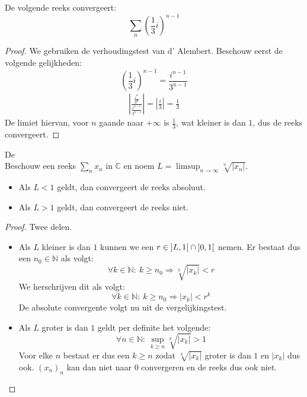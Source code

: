 \documentclass[main.tex]{subfiles}
\begin{document}
\begin{vb}
  De volgende reeks convergeert:
  \[ \sum_{n}\left(\frac{1}{3}i\right)^{n-1} \]

  \begin{proof}
    We gebruiken de verhoudingstest van d' Alembert.
    Beschouw eerst de volgende gelijkheden:
    \[ \left(\frac{1}{3}i\right)^{n-1} = \frac{i^{n-1}}{3^{n-1}} \]
    \begin{align*}
      \left| \frac{\frac{i^{n}}{3^{n}}}{\frac{i^{n-1}}{3^{n-1}}} \right|
      = \left| \frac{i}{3} \right|
      = \frac{1}{3}
    \end{align*}
    De limiet hiervan, voor $n$ gaande naar $+\infty$ is $\frac{1}{3}$, wat kleiner is dan $1$, dus de reeks convergeert.
  \end{proof}
\end{vb}

\begin{st}
  \label{st:worteltest-cauchy}
  De \\
  Beschouw een reeks $\sum_{n}x_{n}$ in $\mathbb{C}$ en noem $L= \limsup_{n\rightarrow \infty}\sqrt[n]{|x_{n}|}$.
  \begin{itemize}
  \item Als $L<1$ geldt, dan convergeert de reeks absoluut.
  \item Als $L>1$ geldt, dan convergeert de reeks niet.
  \end{itemize}

  \begin{proof}
    Twee delen.
    \begin{itemize}
    \item Als $L$ kleiner is dan $1$ kunnen we een $r\in \interval[open]{L}{1} \cap \interval[open]{0}{1}$ nemen.
      Er bestaat dus een $n_{0}\in \mathbb{N}$ als volgt:
      \[ \forall k\in \mathbb{N}:\ k \ge n_{0} \Rightarrow \sqrt[k]{|x_{k}|} < r \]
      We herschrijven dit als volgt:
      \[ \forall k\in \mathbb{N}:\ k \ge n_{0} \Rightarrow |x_{k}| < r^{k} \]
      De absolute convergente volgt nu uit de vergelijkingstest.
    \item Als $L$ groter is dan $1$ geldt per definite het volgende:
      \[ \forall n\in \mathbb{N}:\ \sup_{k\ge n}\sqrt[k]{|x_{k}|} > 1 \]
      Voor elke $n$ bestaat er dus een $k\ge n$ zodat $\sqrt[k]{|x_{k}|}$ groter is dan $1$ en $|x_{k}|$ dus ook.
      $(x_{n})_{n}$ kan dan niet naar $0$ convergeren en de reeks dus ook niet.
    \end{itemize}
  \end{proof}
\end{st}
\end{document}
